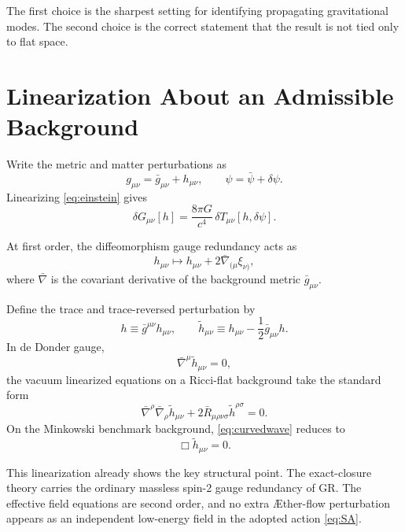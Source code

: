 \documentclass[11pt]{article}
\newcommand{\Aflow}{\AE{}ther-flow}
\begin{document}
The first choice is the sharpest setting for identifying propagating gravitational modes. The second choice is the correct statement that the result is not tied only to flat space.

\section{Linearization About an Admissible Background}

Write the metric and matter perturbations as
\begin{equation}
g_{\mu\nu}=\bar g_{\mu\nu}+h_{\mu\nu},
\qquad
\psi=\bar\psi+\delta\psi.
\label{eq:split}
\end{equation}
Linearizing \eqref{eq:einstein} gives
\begin{equation}
\delta G_{\mu\nu}[h]
=
\frac{8\pi G}{c^4}\,\delta T_{\mu\nu}[h,\delta\psi].
\label{eq:linearizedeinstein}
\end{equation}

At first order, the diffeomorphism gauge redundancy acts as
\begin{equation}
h_{\mu\nu}
\mapsto
h_{\mu\nu}+2\bar\nabla_{(\mu}\xi_{\nu)},
\label{eq:gaugetransform}
\end{equation}
where \(\bar\nabla\) is the covariant derivative of the background metric \(\bar g_{\mu\nu}\).

Define the trace and trace-reversed perturbation by
\begin{equation}
h\equiv \bar g^{\mu\nu}h_{\mu\nu},
\qquad
\widetilde h_{\mu\nu}
\equiv
h_{\mu\nu}-\frac{1}{2}\bar g_{\mu\nu}h.
\label{eq:tracereverse}
\end{equation}
In de Donder gauge,
\begin{equation}
\bar\nabla^\mu \widetilde h_{\mu\nu}=0,
\label{eq:dedonder}
\end{equation}
the vacuum linearized equations on a Ricci-flat background take the standard form
\begin{equation}
\bar\nabla^\rho\bar\nabla_\rho \widetilde h_{\mu\nu}
+
2\bar R_{\mu\rho\nu\sigma}\widetilde h^{\rho\sigma}
=
0.
\label{eq:curvedwave}
\end{equation}
On the Minkowski benchmark background, \eqref{eq:curvedwave} reduces to
\begin{equation}
\Box \widetilde h_{\mu\nu}=0.
\label{eq:minkwave}
\end{equation}

This linearization already shows the key structural point. The exact-closure theory carries the ordinary massless spin-2 gauge redundancy of GR. The effective field equations are second order, and no extra \Aflow{} perturbation appears as an independent low-energy field in the adopted action \eqref{eq:SA}.
\end{document}
